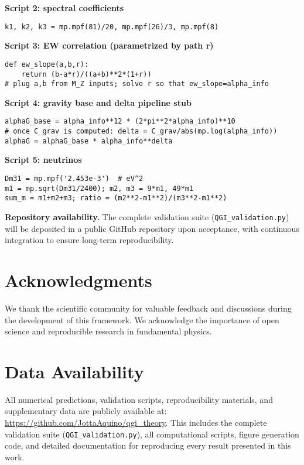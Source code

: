 \documentclass{article}
\numberwithin{equation}{section}
\theoremstyle{plain}
\theoremstyle{definition}
\theoremstyle{remark}
\begin{document}
\noindent
\textbf{Script 2: spectral coefficients}
\begin{verbatim}
k1, k2, k3 = mp.mpf(81)/20, mp.mpf(26)/3, mp.mpf(8)
\end{verbatim}

\noindent
\textbf{Script 3: EW correlation (parametrized by path r)}
\begin{verbatim}
def ew_slope(a,b,r):
    return (b-a*r)/((a+b)**2*(1+r))
# plug a,b from M_Z inputs; solve r so that ew_slope=alpha_info
\end{verbatim}

\noindent
\textbf{Script 4: gravity base and delta pipeline stub}
\begin{verbatim}
alphaG_base = alpha_info**12 * (2*pi**2*alpha_info)**10
# once C_grav is computed: delta = C_grav/abs(mp.log(alpha_info))
alphaG = alphaG_base * alpha_info**delta
\end{verbatim}

\noindent
\textbf{Script 5: neutrinos}
\begin{verbatim}
Dm31 = mp.mpf('2.453e-3')  # eV^2
m1 = mp.sqrt(Dm31/2400); m2, m3 = 9*m1, 49*m1
sum_m = m1+m2+m3; ratio = (m2**2-m1**2)/(m3**2-m1**2)
\end{verbatim}

\medskip
\noindent
\textbf{Repository availability.} The complete validation suite (\texttt{QGI\_validation.py}) will be deposited in a public GitHub repository upon acceptance, with continuous integration to ensure long-term reproducibility.

\section*{Acknowledgments}
\label{sec:acknowledgments}

We thank the scientific community for valuable feedback and discussions during the development of this framework. We acknowledge the importance of open science and reproducible research in fundamental physics.

\section*{Data Availability}
\label{sec:data-availability}

All numerical predictions, validation scripts, reproducibility materials, and supplementary data are publicly available at: \url{https://github.com/JottaAquino/qgi\_theory}. This includes the complete validation suite (\texttt{QGI\_validation.py}), all computational scripts, figure generation code, and detailed documentation for reproducing every result presented in this work.

\printbibliography
\end{document}
